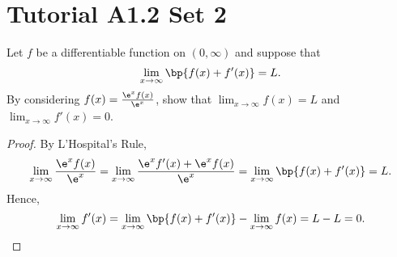 \section{Tutorial A1.2 Set 2}

\begin{problem}
    Let $f$ be a differentiable function on $(0, \infty)$ and suppose that \[\lim_{x \to \infty} \bp{f(x) + f'(x)} = L.\] By considering $f(x) = \frac{\e^x f(x)}{\e^x}$, show that $\lim_{x \to \infty} f(x) = L$ and $\lim_{x \to \infty} f'(x) = 0$.
\end{problem}
\begin{proof}
    By L'Hospital's Rule, \[\lim_{x \to \infty} \frac{\e^x f(x)}{\e^x} = \lim_{x \to \infty} \frac{\e^x f'(x) + \e^x f(x)}{\e^x} = \lim_{x \to \infty} \bp{f(x) + f'(x)} = L.\] Hence, \[\lim_{x \to \infty} f'(x) = \lim_{x \to \infty} \bp{f(x) + f'(x)} - \lim_{x \to \infty} f(x) = L - L = 0.\]
\end{proof}


